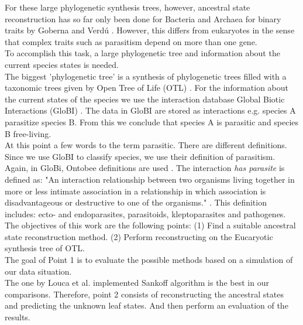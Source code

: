   For these large phylogenetic synthesis trees, however, ancestral state reconstruction has so far 
    only been done for Bacteria and Archaea for binary traits by Goberna and Verdú \cite{Goberna2015}.
    However, this differs from eukaryotes in the sense that complex traits such as parasitism depend
    on more than one gene. \\

  To accomplish this task, a large phylogenetic tree and information about the current species states 
    is needed. \\
  The biggest 'phylogenetic tree' is a synthesis of phylogenetic trees filled with a taxonomic trees 
    given by Open Tree of Life (OTL) \cite{Hinchliff2015}. %
  For the information about the current states of the species we use the interaction database Global 
    Biotic Interactions (GloBI) \cite{Poelen2014}. The data in GloBI are stored as interactions e.g. 
    species A parasitize species B. From this we conclude that species A is parasitic and species B 
    free-living. \\

  At this point a few words to the term parasitic. There are different definitions. Since we use 
    GloBI to classify species, we use their definition of parasitism. Again, in GloBi, Ontobee 
    definitions are used \cite{Xiang2011}.
  The interaction \textit{has parasite} is defined as: "An interaction relationship between two 
    organisms living together in more or less intimate association in a relationship in which 
    association is disadvantageous or destructive to one of the organisms." \cite{...}. This 
    definition includes: ecto- and endoparasites, parasitoids, kleptoparasites and pathogenes.
   \\

  The objectives of this work are the following points: (1) Find a suitable ancestral state 
    reconstruction method. (2) Perform reconstructing on the Eucaryotic synthesis tree of OTL. \\
  The goal of Point 1 is to evaluate the possible methods based on a simulation of our data 
    situation. \\
  The one by Louca et al. implemented Sankoff algorithm is the best in our comparisons. Therefore, 
    point 2 consists of reconstructing the ancestral states and predicting the unknown leaf states. 
    And then perform an evaluation of the results.

